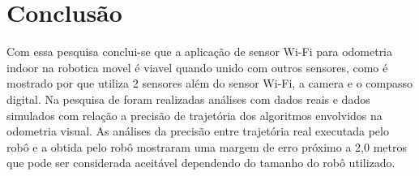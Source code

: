 \chapter{Conclusão}
\label{chap:conc}


Com essa pesquisa conclui-se que a aplicação de sensor Wi-Fi para odometria indoor na robotica movel é viavel quando unido com outros sensores, como é mostrado por \cite{Diego2016} que 
utiliza 2 sensores al\'em do sensor Wi-Fi, a camera e o compasso digital. Na pesquisa de \cite{Diego2016} foram realizadas análises com dados reais e dados simulados com relação a precisão de trajetória dos algoritmos envolvidos na odometria visual. As análises da precisão entre trajetória real executada pelo robô e a obtida
pelo robô mostraram uma margem de erro próximo a 2,0 metros que pode ser considerada
aceitável dependendo do tamanho do robô utilizado.







